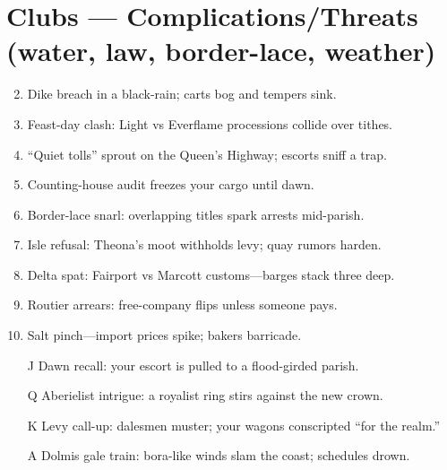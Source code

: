 \section*{Clubs --- Complications/Threats (water, law, border-lace, weather)}
\label{sec:viterra-complications}
\begin{enumerate}
\setcounter{enumi}{1}
\item Dike breach in a black-rain; carts bog and tempers sink.
\item Feast-day clash: Light vs Everflame processions collide over tithes.
\item ``Quiet tolls'' sprout on the Queen's Highway; escorts sniff a trap.
\item Counting-house audit freezes your cargo until dawn.
\item Border-lace snarl: overlapping titles spark arrests mid-parish.
\item Isle refusal: Theona's moot withholds levy; quay rumors harden.
\item Delta spat: Fairport vs Marcott customs---barges stack three deep.
\item Routier arrears: free-company flips unless someone pays.
\item Salt pinch---import prices spike; bakers barricade.
\item[J] Dawn recall: your escort is pulled to a flood-girded parish.
\item[Q] Aberielist intrigue: a royalist ring stirs against the new crown.
\item[K] Levy call-up: dalesmen muster; your wagons conscripted ``for the realm.''
\item[A] Dolmis gale train: bora-like winds slam the coast; schedules drown.
\end{enumerate}

